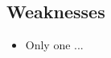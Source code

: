 \documentclass[12pt]{article}  %
\begin{document}
\subsection{Weaknesses}
\begin{itemize}
    \item Only one ...
 \end{itemize}

























































\end{document}
